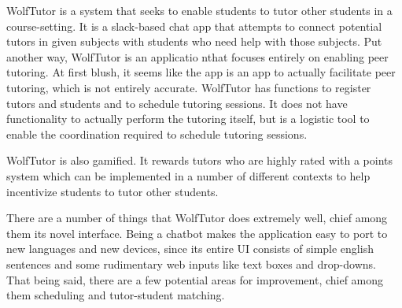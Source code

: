 WolfTutor is a system that seeks to enable students to tutor other students in a
course-setting. It is a slack-based chat app that attempts to connect potential
tutors in given subjects with students who need help with those subjects. Put
another way, WolfTutor is an applicatio nthat focuses entirely on enabling 
peer tutoring. At first blush, it seems like the app is an app to actually
facilitate peer tutoring, which is not entirely accurate. WolfTutor has
functions to register tutors and students and to schedule tutoring sessions. It
does not have functionality to actually perform the tutoring itself, but is a
logistic tool to enable the coordination required to schedule tutoring sessions.

WolfTutor is also gamified. It rewards tutors who are highly rated with a points
system which can be implemented in a number of different contexts to help
incentivize students to tutor other students.

There are a number of things that WolfTutor does extremely well, chief among
them its novel interface.  Being a chatbot makes the application easy to port to
new languages and new devices, since its entire UI consists of simple english
sentences and some rudimentary web inputs like text boxes and drop-downs.  That
being said, there are a few potential areas for improvement, chief among them
scheduling and tutor-student matching. 

